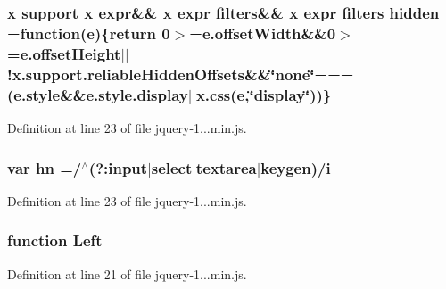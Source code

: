 \subsubsection[{hidden}]{ {\bf x} support {\bf x} expr\&\& {\bf x} expr filters\&\& {\bf x} expr filters hidden =function({\bf e})\{return 0$>$=e.\+offset\+Width\&\&0$>$=e.\+offset\+Height$\vert$$\vert$!x.\+support.\+reliable\+Hidden\+Offsets\&\&\char`\"{}none\char`\"{}===(e.\+style\&\&e.\+style.\+display$\vert$$\vert$x.\+css({\bf e},\char`\"{}display\char`\"{}))\}}\label{_scripts_2jquery-1_810_82_8min_8js_a086b6295ec8d15f090cd7239137a4979}


Definition at line 23 of file jquery-\/1...\+min.\+js.

\hypertarget{_scripts_2jquery-1_810_82_8min_8js_a703d7f6a2aadb540eb051a5f62674194}{}
\subsubsection[{hn}]{\setlength{\rightskip}{0pt plus 5cm}var hn =/$^\wedge$(?\+:{\bf input}$\vert$select$\vert$textarea$\vert$keygen)/{\bf i}}\label{_scripts_2jquery-1_810_82_8min_8js_a703d7f6a2aadb540eb051a5f62674194}


Definition at line 23 of file jquery-\/1...\+min.\+js.

\hypertarget{_scripts_2jquery-1_810_82_8min_8js_abef68bf244a1159a49fe3a2c153a65d2}{}
\subsubsection[{Left}]{\setlength{\rightskip}{0pt plus 5cm}function Left}\label{_scripts_2jquery-1_810_82_8min_8js_abef68bf244a1159a49fe3a2c153a65d2}


Definition at line 21 of file jquery-\/1...\+min.\+js.

\hypertarget{_scripts_2jquery-1_810_82_8min_8js_a227fb8e4dbaed5a772526c7e9bb0795f}{}
